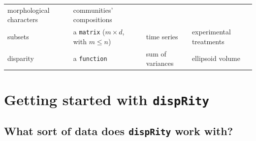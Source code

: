 \documentclass[
]{book}
\begin{document}
\begin{longtable}[]{@{}llll@{}}
\begin{minipage}[t]{0.26\columnwidth}
morphological characters\strut
\end{minipage} & \begin{minipage}[t]{0.19\columnwidth}\raggedright
communities' compositions\strut
\end{minipage}\tabularnewline
\begin{minipage}[t]{0.22\columnwidth}\raggedright
subsets\strut
\end{minipage} & \begin{minipage}[t]{0.22\columnwidth}\raggedright
a \texttt{matrix} (\(m \times d\), with \(m \leq n\))\strut
\end{minipage} & \begin{minipage}[t]{0.26\columnwidth}\raggedright
time series\strut
\end{minipage} & \begin{minipage}[t]{0.19\columnwidth}\raggedright
experimental treatments\strut
\end{minipage}\tabularnewline
\begin{minipage}[t]{0.22\columnwidth}\raggedright
disparity\strut
\end{minipage} & \begin{minipage}[t]{0.22\columnwidth}\raggedright
a \texttt{function}\strut
\end{minipage} & \begin{minipage}[t]{0.26\columnwidth}\raggedright
sum of variances\strut
\end{minipage} & \begin{minipage}[t]{0.19\columnwidth}\raggedright
ellipsoid volume\strut
\end{minipage}\tabularnewline
\bottomrule
\end{longtable}

\hypertarget{getting-started-with-disprity}{%
\chapter{\texorpdfstring{Getting started with \texttt{dispRity}}{Getting started with dispRity}}\label{getting-started-with-disprity}}

\hypertarget{what-sort-of-data-does-disprity-work-with}{%
\section{\texorpdfstring{What sort of data does \texttt{dispRity} work with?}{What sort of data does dispRity work with?}}\label{what-sort-of-data-does-disprity-work-with}}
\end{document}
